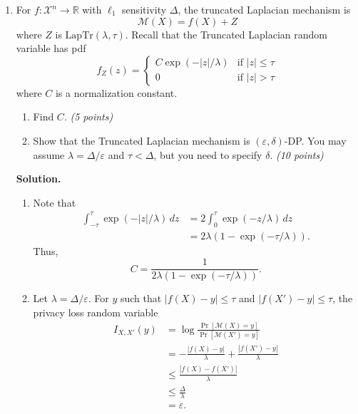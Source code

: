 \documentclass[12pt]{article}
\begin{document}
\begin{enumerate}
\item For $f : \mathcal{X}^n \to \mathbb{R}$ with $\ell_1$ sensitivity $\Delta$, the truncated Laplacian mechanism is
\[
\mathcal{M}(X) = f(X) + Z
\]
where $Z$ is $\mathrm{LapTr}(\lambda, \tau)$. Recall that the Truncated Laplacian random variable has pdf
\[
f_Z(z) =
\begin{cases}
C \exp(-|z|/\lambda) & \text{if } |z| \leq \tau \\
0 & \text{if } |z| > \tau
\end{cases}
\]
where $C$ is a normalization constant.

\begin{enumerate}
    \item[(a)] Find $C$. \textit{(5 points)}
    \item[(b)] Show that the Truncated Laplacian mechanism is $(\varepsilon, \delta)$-DP. You may assume $\lambda = \Delta / \varepsilon$ and $\tau < \Delta$, but you need to specify $\delta$. \textit{(10 points)}
\end{enumerate}
\begin{solution}
\textbf{Solution.}\\
\begin{enumerate}
\item[(a)] Note that
\begin{align*}
    \int_{-\tau}^{\tau} \exp(-|z|/\lambda) \, dz 
    & = 2 \int_0^{\tau} \exp(-z/\lambda) \, dz \\
    & = 2\lambda (1 - \exp(-\tau/\lambda)).
\end{align*}
Thus,
\[
C = \frac{1}{2\lambda (1 - \exp(-\tau/\lambda))}.
\]

\item[(b)] Let $\lambda = \Delta/\varepsilon$. For $y$ such that $|f(X) - y| \leq \tau$ and $|f(X') - y| \leq \tau$, the privacy loss random variable
\begin{align*}
    I_{X,X'}(y) 
    & = \log \frac{\Pr[\mathcal{M}(X) = y]}{\Pr[\mathcal{M}(X') = y]} \\
    & = -\frac{|f(X) - y|}{\lambda} + \frac{|f(X') - y|}{\lambda} \\
    & \leq \frac{|f(X) - f(X')|}{\lambda} \\
    & \leq \frac{\Delta}{\lambda}\\
    & = \varepsilon.
\end{align*}


\end{enumerate}
\end{solution}
\end{enumerate}
\end{document}
